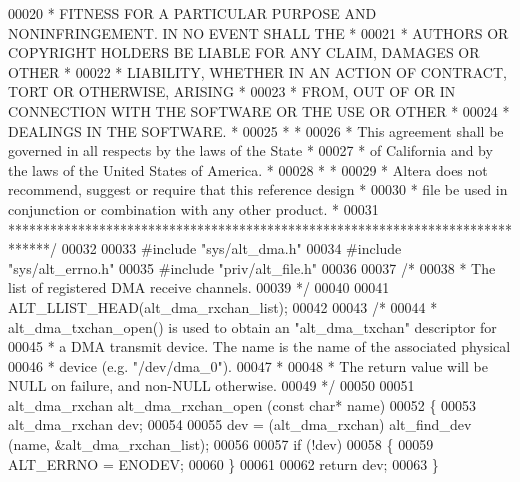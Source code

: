 \begin{DoxyCode}
00020 \textcolor{comment}{* FITNESS FOR A PARTICULAR PURPOSE AND NONINFRINGEMENT. IN NO EVENT SHALL THE *}
00021 \textcolor{comment}{* AUTHORS OR COPYRIGHT HOLDERS BE LIABLE FOR ANY CLAIM, DAMAGES OR OTHER      *}
00022 \textcolor{comment}{* LIABILITY, WHETHER IN AN ACTION OF CONTRACT, TORT OR OTHERWISE, ARISING     *}
00023 \textcolor{comment}{* FROM, OUT OF OR IN CONNECTION WITH THE SOFTWARE OR THE USE OR OTHER         *}
00024 \textcolor{comment}{* DEALINGS IN THE SOFTWARE.                                                   *}
00025 \textcolor{comment}{*                                                                             *}
00026 \textcolor{comment}{* This agreement shall be governed in all respects by the laws of the State   *}
00027 \textcolor{comment}{* of California and by the laws of the United States of America.              *}
00028 \textcolor{comment}{*                                                                             *}
00029 \textcolor{comment}{* Altera does not recommend, suggest or require that this reference design    *}
00030 \textcolor{comment}{* file be used in conjunction or combination with any other product.          *}
00031 \textcolor{comment}{******************************************************************************/}
00032 
00033 \textcolor{preprocessor}{#include "sys/alt_dma.h"}
00034 \textcolor{preprocessor}{#include "sys/alt_errno.h"}
00035 \textcolor{preprocessor}{#include "priv/alt_file.h"}
00036 
00037 \textcolor{comment}{/*}
00038 \textcolor{comment}{ * The list of registered DMA receive channels.}
00039 \textcolor{comment}{ */}
00040 
00041 ALT_LLIST_HEAD(alt\_dma\_rxchan\_list);
00042 
00043 \textcolor{comment}{/*}
00044 \textcolor{comment}{ * alt\_dma\_txchan\_open() is used to obtain an "alt\_dma\_txchan" descriptor for}
00045 \textcolor{comment}{ * a DMA transmit device. The name is the name of the associated physical}
00046 \textcolor{comment}{ * device (e.g. "/dev/dma\_0").}
00047 \textcolor{comment}{ *}
00048 \textcolor{comment}{ * The return value will be NULL on failure, and non-NULL otherwise. }
00049 \textcolor{comment}{ */}
00050 
00051 alt_dma_rxchan alt_dma_rxchan_open (\textcolor{keyword}{const} \textcolor{keywordtype}{char}* name)
00052 \{
00053   alt_dma_rxchan dev;
00054 
00055   dev = (alt_dma_rxchan) alt_find_dev (name, &alt\_dma\_rxchan\_list);
00056 
00057   \textcolor{keywordflow}{if} (!dev)
00058   \{
00059     ALT_ERRNO = ENODEV;
00060   \}
00061 
00062   \textcolor{keywordflow}{return} dev;
00063 \}
\end{DoxyCode}
